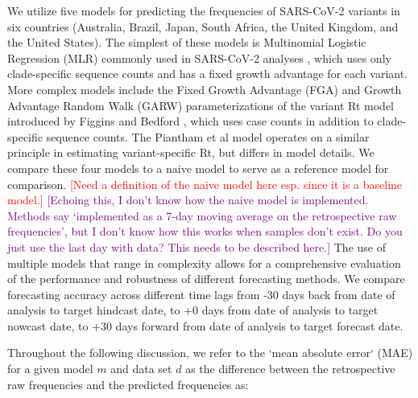 \documentclass[11pt,oneside,letterpaper]{article}
\def\jhc#1{\textcolor{red}{[#1]}}
\def\tbc#1{\textcolor{purple}{[#1]}}
\begin{document}
We utilize five models for predicting the frequencies of SARS-CoV-2 variants in six countries (Australia, Brazil, Japan, South Africa, the United Kingdom, and the United States).
The simplest of these models is Multinomial Logistic Regression (MLR) commonly used in SARS-CoV-2 analyses \cite{annavajhala2021emergence, faria2021genomics, obermeyer2022analysis}, which uses only clade-specific sequence counts and has a fixed growth advantage for each variant.
More complex models include the Fixed Growth Advantage (FGA) and Growth Advantage Random Walk (GARW) parameterizations of the variant Rt model introduced by Figgins and Bedford \cite{figgins2022sars}, which uses case counts in addition to clade-specific sequence counts.
The Piantham et al model \cite{piantham2021estimating} operates on a similar principle in estimating variant-specific Rt, but differs in model details.
We compare these four models to a naive model to serve as a reference model for comparison.
\jhc{Need a definition of the naive model here esp. since it is a baseline model.}
\tbc{Echoing this, I don't know how the naive model is implemented. Methods say `implemented as a 7-day moving average on the retrospective raw frequencies', but I don't know how this works when samples don't exist. Do you just use the last day with data? This needs to be described here.}
The use of multiple models that range in complexity allows for a comprehensive evaluation of the performance and robustness of different forecasting methods.
We compare forecasting accuracy across different time lags from -30 days back from date of analysis to target hindcast date, to +0 days from date of analysis to target nowcast date, to +30 days forward from date of analysis to target forecast date.


Throughout the following discussion, we refer to the `mean absolute error` (MAE) for a given model $m$ and data set $d$ as the difference between the retrospective raw frequencies and the predicted frequencies as:
\end{document}
